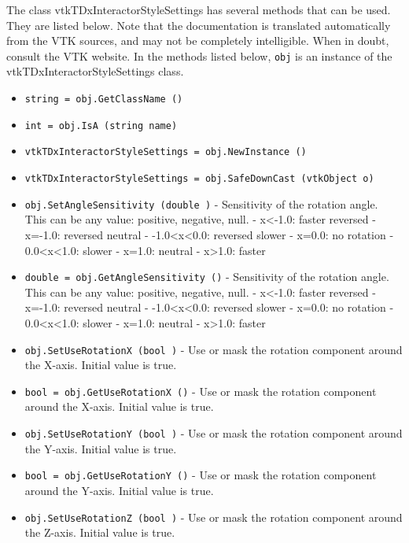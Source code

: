 The class vtkTDxInteractorStyleSettings has several methods that can be used.
  They are listed below.
Note that the documentation is translated automatically from the VTK sources,
and may not be completely intelligible.  When in doubt, consult the VTK website.
In the methods listed below, \verb|obj| is an instance of the vtkTDxInteractorStyleSettings class.
\begin{itemize}
\item  \verb|string = obj.GetClassName ()|

\item  \verb|int = obj.IsA (string name)|

\item  \verb|vtkTDxInteractorStyleSettings = obj.NewInstance ()|

\item  \verb|vtkTDxInteractorStyleSettings = obj.SafeDownCast (vtkObject o)|

\item  \verb|obj.SetAngleSensitivity (double )| -  Sensitivity of the rotation angle. This can be any value:
 positive, negative, null.
 - x<-1.0: faster reversed
 - x=-1.0: reversed neutral
 - -1.0<x<0.0:  reversed slower
 - x=0.0: no rotation
 - 0.0<x<1.0: slower
 - x=1.0: neutral
 - x>1.0: faster

\item  \verb|double = obj.GetAngleSensitivity ()| -  Sensitivity of the rotation angle. This can be any value:
 positive, negative, null.
 - x<-1.0: faster reversed
 - x=-1.0: reversed neutral
 - -1.0<x<0.0:  reversed slower
 - x=0.0: no rotation
 - 0.0<x<1.0: slower
 - x=1.0: neutral
 - x>1.0: faster

\item  \verb|obj.SetUseRotationX (bool )| -  Use or mask the rotation component around the X-axis. Initial value is
 true.

\item  \verb|bool = obj.GetUseRotationX ()| -  Use or mask the rotation component around the X-axis. Initial value is
 true.

\item  \verb|obj.SetUseRotationY (bool )| -  Use or mask the rotation component around the Y-axis. Initial value is
 true.

\item  \verb|bool = obj.GetUseRotationY ()| -  Use or mask the rotation component around the Y-axis. Initial value is
 true.

\item  \verb|obj.SetUseRotationZ (bool )| -  Use or mask the rotation component around the Z-axis. Initial value is
 true.


\end{itemize}
